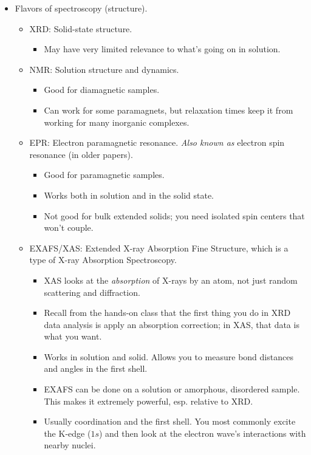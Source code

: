 \documentclass[../notes.tex]{subfiles}
\begin{document}
\begin{itemize}
\begin{itemize}
    \end{itemize}
    \item Flavors of spectroscopy (structure).
    \begin{itemize}
        \item XRD: Solid-state structure.
        \begin{itemize}
            \item May have very limited relevance to what's going on in solution.
        \end{itemize}
        \item NMR: Solution structure and dynamics.
        \begin{itemize}
            \item Good for diamagnetic samples.
            \item Can work for some paramagnets, but relaxation times keep it from working for many inorganic complexes.
        \end{itemize}
        \item EPR: Electron paramagnetic resonance. \emph{Also known as} electron spin resonance (in older papers).
        \begin{itemize}
            \item Good for paramagnetic samples.
            \item Works both in solution and in the solid state.
            \item Not good for bulk extended solids; you need isolated spin centers that won't couple.
        \end{itemize}
        \item EXAFS/XAS: Extended X-ray Absorption Fine Structure, which is a type of X-ray Absorption Spectroscopy.
        \begin{itemize}
            \item XAS looks at the \emph{absorption} of X-rays by an atom, not just random scattering and diffraction.
            \item Recall from the hands-on class that the first thing you do in XRD data analysis is apply an absorption correction; in XAS, that data is what you want.
            \item Works in solution and solid. Allows you to measure bond distances and angles in the first shell.
            \item EXAFS can be done on a solution or amorphous, disordered sample. This makes it extremely powerful, esp. relative to XRD.
            \item Usually coordination and the first shell. You most commonly excite the K-edge ($1s$) and then look at the electron wave's interactions with nearby nuclei.

\end{itemize}
\end{itemize}
\end{itemize}
\end{document}
